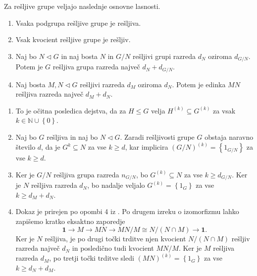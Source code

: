     \begin{trditev}
    \label{trd_lastnosti_resljivih_grup}
    Za rešljive grupe veljajo naslednje osnovne lasnosti.
     \begin{enumerate}
        \item Vsaka podgrupa rešljive grupe je rešljiva.
        \item Vsak kvocient rešljive grupe je rešljiv.
        \item Naj bo $N \triangleleft G$ in naj bosta $N$ in $G / N$ rešljivi grupi razreda $d_{N}$ oziroma $d_{G / N}$. Potem je $G$ rešljiva grupa razreda največ $d_N + d_{G / N}$.
        \item Naj bosta $M, N \triangleleft G$ rešljivi razreda $d_M$ oziroma $d_N$. Potem je edinka $MN$ rešljiva razreda največ $d_M + d_N$.   
     \end{enumerate}
    \end{trditev}
    \begin{dokaz}
        \begin{enumerate}
            \item To je očitna posledica dejstva, da za $H \le G$ velja $H^{(k)} \subseteq G^{(k)}$ za vsak $k \in \mathbb{N} \cup \left\{ 0\right\}$.
            \item Naj bo $G$ rešljiva in naj bo $N \triangleleft G$. Zaradi rešljivosti grupe $G$ obstaja naravno število $d$, da je $G^{k} \subseteq N$ za vse $k \ge d$, kar implicira $ (G / N)^{(k)} = \left\{ 1_{G / N}\right\}$ za vse $k \ge d$. 
            \item Ker je $G / N$ rešljiva grupa razreda $n_{G / N}$, bo $G^{(k)} \subseteq N$ za vse $k \ge d_{G / N}$. Ker je $N$ rešljiva razreda $d_N$, bo nadalje veljalo $G^{(k)} = \left\{ 1_G\right\}$ za vse $k \ge d_M + d_N$.
            \item Dokaz je prirejen po opombi 4 iz \cite[str.4]{Schneider_2016}. Po drugem izreku o izomorfizmu lahko zapišemo kratko eksaktno zaporedje \begin{equation*}
            \mathbf{1} \to M \to MN \to MN / M \cong N / (N \cap M) \to \mathbf{1}.
            \end{equation*}  
            Ker je $N$ rešljiva, je po drugi točki trditve  njen kvocient $ N / (N \cap M)$ rešljiv razreda največ $d_N$ in posledično tudi kvocient $ MN / M $. Ker je $M$ rešljiva razreda $d_M$, po tretji točki trditve sledi $(MN)^{(k)} = \left\{ 1_{G}\right\}$ za vse $k \ge d_N + d_M$.
        \end{enumerate}
    \end{dokaz}

